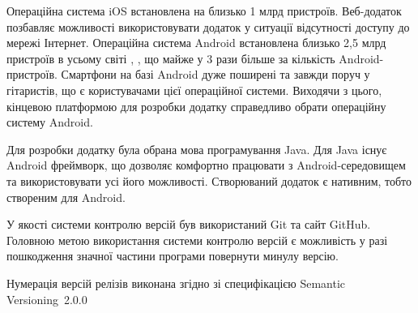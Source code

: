 Операційна система iOS встановлена на близько 1 млрд пристроїв. Веб-додаток позбавляє можливості використовувати додаток у ситуації відсутності доступу до мережі Інтернет. Операційна система Android встановлена близько 2,5 млрд пристроїв в усьому світі \cite{androiddevelopers}, , що майже у 3 рази більше за кількість Android-пристроїв. Смартфони на базі Android дуже поширені та завжди поруч у гітаристів, що є користувачами цієї операційної системи. Виходячи з цього, кінцевою платформою для розробки додатку справедливо обрати операційну систему Android.

Для розробки додатку була обрана мова програмування Java. Для Java існує Android фреймворк, що дозволяє комфортно працювати з Android-середовищем та використовувати усі його можливості. Створюваний додаток є нативним, тобто створеним для Android. 

У якості системи контролю версій був використаний Git та сайт GitHub. Головною метою використання системи контролю версій є можливість у разі пошкодження значної частини програми повернути минулу версію.

Нумерація версій релізів виконана згідно зі специфікацією Semantic Versioning~2.0.0~\cite{preston-werner}